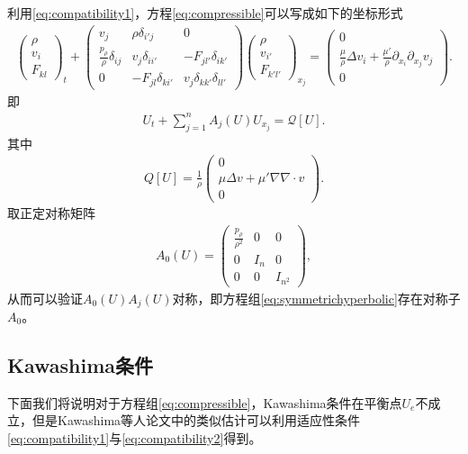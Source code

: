 利用\eqref{eq:compatibility1}，方程\eqref{eq:compressible}可以写成如下的坐标形式
\begin{eqnarray*}
  \left( \begin{array}{c} \rho \\ v_i \\ F_{kl} \end{array} \right)_t
  +
  \left( \begin{array}{ccc} v_j & \rho \delta_{i'j} & 0 \\
    \frac{p_\rho}{\rho} \delta_{ij} & v_j \delta_{ii'} & -F_{jl'} \delta_{ik'} \\
    0 & - F_{jl}\delta_{ki'}  & v_j \delta_{kk'} \delta_{ll'} \end{array} \right)
  \left( \begin{array}{c} \rho \\ v_{i'} \\ F_{k'l'} \end{array} \right)_{x_j}
=
\left( \begin{array}{c} 0 \\ \frac{\mu}{\rho} \Delta {v_i} + \frac{\mu'}{\rho} \partial_{x_i} \partial_{x_j} v_j  \\ 0 \end{array} \right).
\end{eqnarray*}
即
\begin{eqnarray}\label{eq:symmetrichyperbolic}
  U_t + \sum_{j=1}^n A_j(U) U_{x_j} = \mathcal{Q}[U].
\end{eqnarray}
其中
\begin{eqnarray*}
  Q[U] = \frac{1}{\rho}\left( \begin{array}{c} 0\\ \mu\Delta  v + \mu'\nabla \nabla \cdot  v  \\ 0 \end{array} \right).
\end{eqnarray*}
取正定对称矩阵
\begin{eqnarray}
  A_0(U) = \left( \begin{array}{ccc} \frac{p_\rho}{\rho^2} & 0 & 0 \\
                                                   0 & I_n & 0 \\
						   0 & 0 & I_{n^2}\end{array} \right),
\end{eqnarray}
从而可以验证$A_0(U) A_j(U)$对称，即方程组\eqref{eq:symmetrichyperbolic}存在对称子$A_0$。

\subsection{Kawashima条件}
下面我们将说明对于方程组\eqref{eq:compressible}，Kawashima条件在平衡点$U_e$不成立，但是Kawashima等人论文\cite{shizuta1985systems,kawashima1984systems}中的类似估计可以利用适应性条件\eqref{eq:compatibility1}与\eqref{eq:compatibility2}得到。

